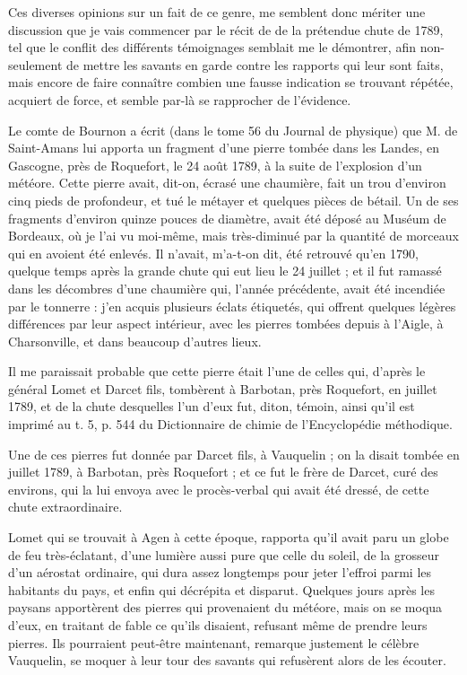 \documentclass[a4paper, 12pt, oneside, french]{article}
\begin{document}
Ces diverses opinions sur un fait de ce genre, me semblent donc mériter une discussion que je vais commencer par le récit de de la prétendue chute de 1789, tel que le conflit des différents témoignages semblait me le démontrer, afin non-seulement de mettre les savants en garde contre les rapports qui leur sont faits, mais encore de faire connaître combien une fausse indication se trouvant répétée, acquiert de force, et semble par-là se rapprocher de l'évidence.

Le comte de Bournon a écrit (dans le tome 56 du Journal de physique) que M. de Saint-Amans lui apporta un fragment d'une pierre tombée dans les Landes, en Gascogne, près de Roquefort, le 24 août 1789, à la suite de l'explosion d'un météore. Cette pierre avait, dit-on, écrasé une chaumière, fait un trou d'environ cinq pieds de profondeur, et tué le métayer et quelques pièces de bétail. Un de ses fragments d'environ quinze pouces de diamètre, avait été déposé au Muséum de Bordeaux, où je l'ai vu moi-même, mais très-diminué par la quantité de morceaux qui en avoient été enlevés. Il n'avait, m'a-t-on dit, été retrouvé qu'en 1790, quelque temps après la grande chute qui eut lieu le 24 juillet ; et il fut ramassé dans les décombres d'une chaumière qui, l'année précédente, avait été incendiée par le tonnerre : j'en acquis plusieurs éclats étiquetés, qui offrent quelques légères différences par leur aspect intérieur, avec les pierres tombées depuis à l'Aigle, à Charsonville, et dans beaucoup d'autres lieux.

Il me paraissait probable que cette pierre était l'une de celles qui, d'après le général Lomet et Darcet fils, tombèrent à Barbotan, près Roquefort, en juillet 1789, et de la chute desquelles l'un d'eux fut, diton, témoin, ainsi qu'il est imprimé au t. 5, p. 544 du Dictionnaire de chimie de l'Encyclopédie méthodique.

Une de ces pierres fut donnée par Darcet fils, à Vauquelin ; on la disait tombée en juillet 1789, à Barbotan, près Roquefort ; et ce fut le frère de Darcet, curé des environs, qui la lui envoya avec le procès-verbal qui avait été dressé, de cette chute extraordinaire.

Lomet qui se trouvait à Agen à cette époque, rapporta qu'il avait paru un globe de feu très-éclatant, d'une lumière aussi pure que celle du soleil, de la grosseur d'un aérostat ordinaire, qui dura assez longtemps pour jeter l'effroi parmi les habitants du pays, et enfin qui décrépita et disparut. Quelques jours après les paysans apportèrent des pierres qui provenaient du météore, mais on se moqua d'eux, en traitant de fable ce qu'ils disaient, refusant même de prendre leurs pierres. Ils pourraient peut-être maintenant, remarque justement le célèbre Vauquelin, se moquer à leur tour des savants qui refusèrent alors de les écouter.
\end{document}
